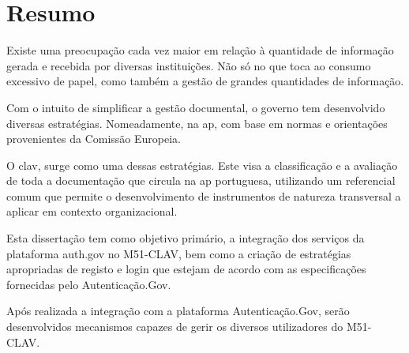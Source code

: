 \chapter*{Resumo}

Existe uma preocupação cada vez maior em relação à quantidade de informação gerada e recebida por diversas instituições. Não só no que toca ao consumo excessivo de papel, como também a gestão de grandes quantidades de informação.

Com o intuito de simplificar a gestão documental, o governo tem desenvolvido diversas estratégias. Nomeadamente, na \gls{ap}, com base em normas e orientações provenientes da Comissão Europeia.

O \gls{clav}, surge como uma dessas estratégias. Este visa a classificação e a avaliação de toda a documentação que circula na \gls{ap} portuguesa, utilizando um referencial comum que permite o desenvolvimento de instrumentos de natureza transversal a aplicar em contexto organizacional.

Esta dissertação tem como objetivo primário, a integração dos serviços da plataforma \gls{auth.gov} no M51-CLAV, bem como a criação de estratégias apropriadas de registo e login que estejam de acordo com as especificações fornecidas pelo Autenticação.Gov.

Após realizada a integração com a plataforma Autenticação.Gov, serão desenvolvidos mecanismos capazes de gerir os diversos utilizadores do M51-CLAV.